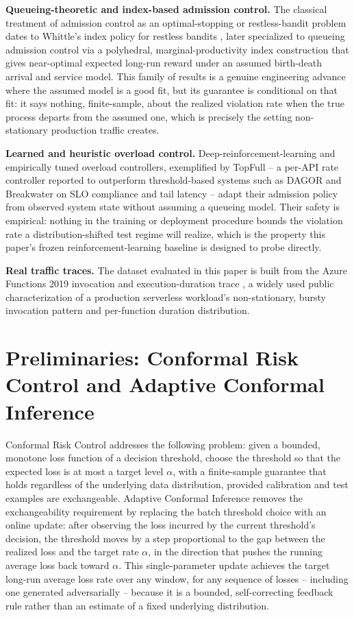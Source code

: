 \documentclass[11pt,letterpaper]{article}
\begin{document}
\textbf{Queueing-theoretic and index-based admission control.} The classical treatment of admission control as an optimal-stopping or restless-bandit problem dates to Whittle's index policy for restless bandits \citep{Whittle1988}, later specialized to queueing admission control via a polyhedral, marginal-productivity index construction \citep{NinoMora2002} that gives near-optimal expected long-run reward under an assumed birth-death arrival and service model. This family of results is a genuine engineering advance where the assumed model is a good fit, but its guarantee is conditional on that fit: it says nothing, finite-sample, about the realized violation rate when the true process departs from the assumed one, which is precisely the setting non-stationary production traffic creates.

\textbf{Learned and heuristic overload control.} Deep-reinforcement-learning and empirically tuned overload controllers, exemplified by TopFull \citep{Park2024} -- a per-API rate controller reported to outperform threshold-based systems such as DAGOR and Breakwater on SLO compliance and tail latency -- adapt their admission policy from observed system state without assuming a queueing model. Their safety is empirical: nothing in the training or deployment procedure bounds the violation rate a distribution-shifted test regime will realize, which is the property this paper's frozen reinforcement-learning baseline is designed to probe directly.

\textbf{Real traffic traces.} The dataset evaluated in this paper is built from the Azure Functions 2019 invocation and execution-duration trace \citep{Shahrad2020}, a widely used public characterization of a production serverless workload's non-stationary, bursty invocation pattern and per-function duration distribution.

\section{Preliminaries: Conformal Risk Control and Adaptive Conformal Inference}

Conformal Risk Control \citep{Angelopoulos2022} addresses the following problem: given a bounded, monotone loss function of a decision threshold, choose the threshold so that the expected loss is at most a target level $\alpha$, with a finite-sample guarantee that holds regardless of the underlying data distribution, provided calibration and test examples are exchangeable. Adaptive Conformal Inference \citep{Gibbs2021} removes the exchangeability requirement by replacing the batch threshold choice with an online update: after observing the loss incurred by the current threshold's decision, the threshold moves by a step proportional to the gap between the realized loss and the target rate $\alpha$, in the direction that pushes the running average loss back toward $\alpha$. This single-parameter update achieves the target long-run average loss rate over any window, for any sequence of losses -- including one generated adversarially -- because it is a bounded, self-correcting feedback rule rather than an estimate of a fixed underlying distribution.
\end{document}
